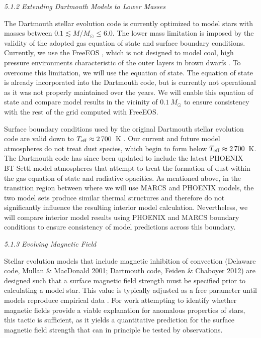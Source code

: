 {\it 5.1.2 Extending Dartmouth Models to Lower Masses}

The Dartmouth stellar evolution code is currently optimized to model stars with masses between $0.1 \lesssim M/M_{\odot} \le 6.0$. The lower mass limitation is imposed by the validity of the adopted gas equation of state and surface boundary conditions. Currently, we use the FreeEOS \citep{Irwin2007}, which is not designed to model cool, high pressure environments characteristic of the outer layers in brown dwarfs \citep{Chabrier2000}. To overcome this limitation, we will use the \citet{scvh95} equation of state. The equation of state is already incorporated into the Dartmouth code, but is currently not operational as it was not properly maintained over the years. We will enable this equation of state and compare model results in the vicinity of $0.1\ M_{\odot}$ to ensure consistency with the rest of the grid computed with FreeEOS.

Surface boundary conditions used by the original Dartmouth stellar evolution code are valid down to $T_{\rm eff} \approx 2\,700$~K \citep{Hauschildt1999a}. Our current \citep{Hauschildt1999a} and future \citep{Gustafsson2008} model atmospheres do not treat dust species, which begin to form below $T_{\rm eff} \approx 2\,700$~K. The Dartmouth code has since been updated to include the latest PHOENIX BT-Settl model atmospheres \citep{Allard2011} that attempt to treat the formation of dust within the gas equation of state and radiative opacities. As mentioned above, in the transition region between where we will use MARCS and PHOENIX models, the two model sets produce similar thermal structures and therefore do not significantly influence the resulting interior model calculation. Nevertheless, we will compare interior model results using PHOENIX and MARCS boundary conditions to ensure consistency of model predictions across this boundary.

{\it 5.1.3 Evolving Magnetic Field}


Stellar evolution models that include magnetic inhibition of convection (Delaware code, Mullan \& MacDonald 2001; Dartmouth code, Feiden \& Chaboyer 2012) are designed such that a surface magnetic field strength must be specified prior to calculating a model star. This value is typically adjusted as a free parameter until models reproduce empirical data \citep[e.g., radii of stars in EBs;][]{FC12b, FC13, FC14, MM14}. For work attempting to identify whether magnetic fields provide a viable explanation for anomalous properties of stars, this tactic is sufficient, as it yields a quantitative prediction for the surface magnetic field strength that can in principle be tested by observations. 

